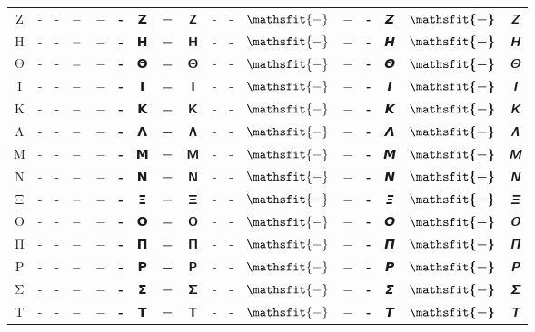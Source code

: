 \documentclass{standalone}
\newcommand{\SANS}[1]{\ifmmode\mathsf{#1}\else\textsf{#1}\fi}
\newcommand{\BSANS}[1]{\ifmmode\boldsymbol{\mathsf{#1}}\else\textbf{\textsf{#1}}\fi}
\newcommand{\ISANS}[1]{\ifmmode\mathsfit{#1}\else\textit{\textsf{#1}}\fi}
\newcommand{\BISANS}[1]{\ifmmode\bm{\mathsfit{#1}}\else\textbf{\textsf{\textit{#1}}}\fi}
\begin{document}
\begin{tabular}{c|cc|cc|cc|cc|cc|cc|cc|cc}
Ζ & \SANS{-} & - & $\SANS{-}$ & $-$ & \BSANS{-} & 𝝛 & $\BSANS{-}$ & $𝝛$ & \ISANS{-} & - & $\ISANS{-}$ & $-$ & \BISANS{-} & 𝞕 & $\BISANS{-}$ & $𝞕$ \\
Η & \SANS{-} & - & $\SANS{-}$ & $-$ & \BSANS{-} & 𝝜 & $\BSANS{-}$ & $𝝜$ & \ISANS{-} & - & $\ISANS{-}$ & $-$ & \BISANS{-} & 𝞖 & $\BISANS{-}$ & $𝞖$ \\
Θ & \SANS{-} & - & $\SANS{-}$ & $-$ & \BSANS{-} & 𝝝 & $\BSANS{-}$ & $𝝝$ & \ISANS{-} & - & $\ISANS{-}$ & $-$ & \BISANS{-} & 𝞗 & $\BISANS{-}$ & $𝞗$ \\
Ι & \SANS{-} & - & $\SANS{-}$ & $-$ & \BSANS{-} & 𝝞 & $\BSANS{-}$ & $𝝞$ & \ISANS{-} & - & $\ISANS{-}$ & $-$ & \BISANS{-} & 𝞘 & $\BISANS{-}$ & $𝞘$ \\
Κ & \SANS{-} & - & $\SANS{-}$ & $-$ & \BSANS{-} & 𝝟 & $\BSANS{-}$ & $𝝟$ & \ISANS{-} & - & $\ISANS{-}$ & $-$ & \BISANS{-} & 𝞙 & $\BISANS{-}$ & $𝞙$ \\
Λ & \SANS{-} & - & $\SANS{-}$ & $-$ & \BSANS{-} & 𝝠 & $\BSANS{-}$ & $𝝠$ & \ISANS{-} & - & $\ISANS{-}$ & $-$ & \BISANS{-} & 𝞚 & $\BISANS{-}$ & $𝞚$ \\
Μ & \SANS{-} & - & $\SANS{-}$ & $-$ & \BSANS{-} & 𝝡 & $\BSANS{-}$ & $𝝡$ & \ISANS{-} & - & $\ISANS{-}$ & $-$ & \BISANS{-} & 𝞛 & $\BISANS{-}$ & $𝞛$ \\
Ν & \SANS{-} & - & $\SANS{-}$ & $-$ & \BSANS{-} & 𝝢 & $\BSANS{-}$ & $𝝢$ & \ISANS{-} & - & $\ISANS{-}$ & $-$ & \BISANS{-} & 𝞜 & $\BISANS{-}$ & $𝞜$ \\
Ξ & \SANS{-} & - & $\SANS{-}$ & $-$ & \BSANS{-} & 𝝣 & $\BSANS{-}$ & $𝝣$ & \ISANS{-} & - & $\ISANS{-}$ & $-$ & \BISANS{-} & 𝞝 & $\BISANS{-}$ & $𝞝$ \\
Ο & \SANS{-} & - & $\SANS{-}$ & $-$ & \BSANS{-} & 𝝤 & $\BSANS{-}$ & $𝝤$ & \ISANS{-} & - & $\ISANS{-}$ & $-$ & \BISANS{-} & 𝞞 & $\BISANS{-}$ & $𝞞$ \\
Π & \SANS{-} & - & $\SANS{-}$ & $-$ & \BSANS{-} & 𝝥 & $\BSANS{-}$ & $𝝥$ & \ISANS{-} & - & $\ISANS{-}$ & $-$ & \BISANS{-} & 𝞟 & $\BISANS{-}$ & $𝞟$ \\
Ρ & \SANS{-} & - & $\SANS{-}$ & $-$ & \BSANS{-} & 𝝦 & $\BSANS{-}$ & $𝝦$ & \ISANS{-} & - & $\ISANS{-}$ & $-$ & \BISANS{-} & 𝞠 & $\BISANS{-}$ & $𝞠$ \\
Σ & \SANS{-} & - & $\SANS{-}$ & $-$ & \BSANS{-} & 𝝨 & $\BSANS{-}$ & $𝝨$ & \ISANS{-} & - & $\ISANS{-}$ & $-$ & \BISANS{-} & 𝞢 & $\BISANS{-}$ & $𝞢$ \\
Τ & \SANS{-} & - & $\SANS{-}$ & $-$ & \BSANS{-} & 𝝩 & $\BSANS{-}$ & $𝝩$ & \ISANS{-} & - & $\ISANS{-}$ & $-$ & \BISANS{-} & 𝞣 & $\BISANS{-}$ & $𝞣$ \\

\end{tabular}
\end{document}
